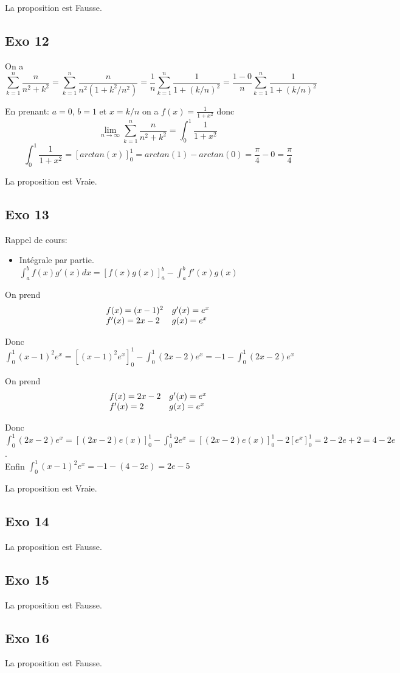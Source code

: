 \documentclass[]{book}
\theoremstyle{definition}
\begin{document}
La proposition est Fausse.

\subsection*{Exo 12}
On a $$\sum_{k=1}^{n}\frac{n}{n^2+k^2} = \sum_{k=1}^{n}\frac{n}{n^2(1+k^2/n^2)} = \frac{1}{n}\sum_{k=1}^{n}\frac{1}{1+(k/n)^2} = \frac{1-0}{n}\sum_{k=1}^{n}\frac{1}{1+(k/n)^2}$$

En prenant: $a=0$, $b=1$ et $x=k/n$ on a $f(x)=\frac{1}{1+x^2}$ donc
$$\lim_{n \to \infty}\sum_{k=1}^{n}\frac{n}{n^2+k^2} = \int_0^1 \frac{1}{1+x^2}$$
$$\int_0^1 \frac{1}{1+x^2} = [arctan(x)]_0^1 = arctan(1) - arctan(0) = \frac{\pi}{4} - 0 = \frac{\pi}{4}$$

La proposition est Vraie.

\subsection*{Exo 13}
Rappel de cours:
\begin{itemize}
\item Int\'egrale par partie. $\int_{a}^{b} f(x)g'(x)dx = [f(x)g(x)]_{a}^{b} - \int_{a}^{b}f'(x)g(x)$
\end{itemize}

On prend
$$
\begin{array}{l l}
 f(x) = (x-1)^2 & g'(x) = e^x\\
 f'(x) = 2x-2   & g(x) = e^x\\
\end{array}
$$

\medskip
Donc $\int_0^1(x-1)^2e^x = [(x-1)^2e^x]_0^1 - \int_0^1 (2x-2)e^x = -1 - \int_0^1 (2x-2)e^x$

On prend
$$
\begin{array}{l l}
 f(x) = 2x-2 & g'(x) = e^x\\
 f'(x) = 2   & g(x) = e^x\\
\end{array}
$$

\medskip
Donc $\int_0^1 (2x-2)e^x = [(2x-2)e(x)]_0^1 - \int_0^1 2e^x = [(2x-2)e(x)]_0^1 - 2[e^x]_0^1 = 2 - 2e + 2 = 4 - 2e$.\\

Enfin $\int_0^1(x-1)^2e^x = -1 - (4 - 2e) = 2e - 5$


La proposition est Vraie.

\subsection*{Exo 14}

La proposition est Fausse.

\subsection*{Exo 15}

La proposition est Fausse.

\subsection*{Exo 16}

La proposition est Fausse.
\end{document}
